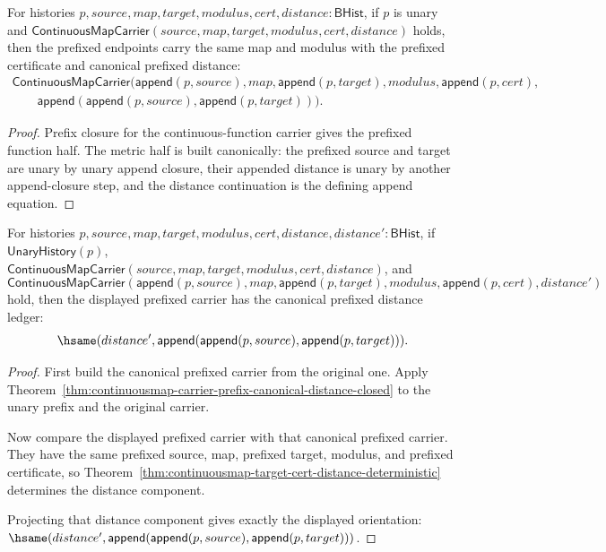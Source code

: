\begin{theorem}
\label{thm:continuousmap-carrier-prefix-canonical-distance-closed}
For histories $p,source,map,target,modulus,cert,distance:\mathsf{BHist}$,
if $p$ is unary and
$\mathsf{ContinuousMapCarrier}(source,map,target,modulus,cert,distance)$
holds, then the prefixed endpoints carry the same map and modulus with the
prefixed certificate and canonical prefixed distance:
$$
\begin{array}{l}
\mathsf{ContinuousMapCarrier}
(\mathsf{append}(p,source),map,\mathsf{append}(p,target),modulus,
\mathsf{append}(p,cert),\\
\qquad \mathsf{append}(\mathsf{append}(p,source),\mathsf{append}(p,target))).
\end{array}
$$
\end{theorem}
\begin{proof}
Prefix closure for the continuous-function carrier gives the prefixed function
half. The metric half is built canonically: the prefixed source and target are
unary by unary append closure, their appended distance is unary by another
append-closure step, and the distance continuation is the defining append
equation.
\end{proof}

\begin{theorem}
\label{thm:continuousmap-prefix-canonical-distance-determinacy}
For histories $p,source,map,target,modulus,cert,distance,distance':\mathsf{BHist}$,
if $\mathsf{UnaryHistory}(p)$,
$\mathsf{ContinuousMapCarrier}(source,map,target,modulus,cert,distance)$, and
$$
\mathsf{ContinuousMapCarrier}
(\mathsf{append}(p,source),map,\mathsf{append}(p,target),modulus,
\mathsf{append}(p,cert),distance')
$$
hold, then the displayed prefixed carrier has the canonical prefixed distance
ledger:
$$
\hsame(distance',
\mathsf{append}(\mathsf{append}(p,source),\mathsf{append}(p,target))).
$$
\end{theorem}
\begin{proof}
First build the canonical prefixed carrier from the original one. Apply
Theorem~\ref{thm:continuousmap-carrier-prefix-canonical-distance-closed} to
the unary prefix and the original carrier.

Now compare the displayed prefixed carrier with that canonical prefixed
carrier. They have the same prefixed source, map, prefixed target, modulus, and
prefixed certificate, so
Theorem~\ref{thm:continuousmap-target-cert-distance-deterministic} determines
the distance component.

Projecting that distance component gives exactly the displayed orientation:
$\hsame(distance',
\mathsf{append}(\mathsf{append}(p,source),\mathsf{append}(p,target)))$.
\end{proof}

